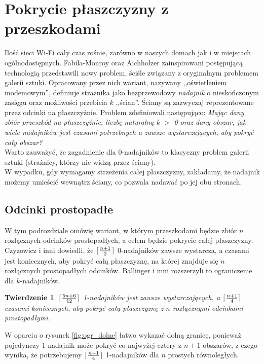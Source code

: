 \documentclass[brudnopis]{xmgr}
\DeclarePairedDelimiter\ceil{\lceil}{\rceil}
\newtheorem{Twierdzenie}{Twierdzenie}
\theoremstyle{definition}
\begin{document}
\section{Pokrycie płaszczyzny z przeszkodami}\label{sec:knadajniki}
	Ilość sieci Wi-Fi cały czas rośnie, zarówno w naszych domach jak i w miejscach ogólnodostępnych. Fabila-Monroy oraz Aichholzer \cite{fabilamonroy} zainspirowani postępującą technologią przedstawili nowy problem, ściśle związany z oryginalnym problemem galerii sztuki. Opracowany przez nich wariant, nazywany ,,oświetleniem modemowym'', definiuje strażnika jako bezprzewodowy \emph{nadajnik} o nieskończonym zasięgu oraz możliwości przebicia $k$ ,,ścian''. Ściany są zazwyczaj reprezentowane przez odcinki na płaszczyźnie. Problem zdefiniowali następująco: \emph{Mając dany zbiór przeszkód na płaszczyźnie, liczbę naturalną k $>$ 0 oraz dany obszar, jak wiele nadajników jest czasami potrzebnych a zawsze wystarczających, aby pokryć cały obszar?}  
\\\indent Warto zauważyć, że zagadnienie dla 0-nadajników to klasyczny problem galerii sztuki (strażnicy, którzy nie widzą przez ściany).
\\\indent W wypadku, gdy wymagamy strzeżenia całej płaszczyzny, zakładamy, że nadajnik możemy umieścić wewnątrz ściany, co pozwala nadawać po jej obu stronach.
\subsection{Odcinki prostopadłe}
W tym podrozdziale omówię wariant, w którym przeszkodami będzie zbiór $n$ rozłącznych odcinków prostopadłych, a celem będzie pokrycie całej płaszczyzny. Czyzowicz i inni \cite{czyzowicz} dowiedli, że $\ceil{\frac{n+1}{2}}$ 0-nadajników zawsze wystarcza, a czasami jest koniecznych, aby pokryć całą płaszczyznę, na której znajduje się $n$ rozłącznych prostopadłych odcinków. Ballinger i inni \cite{knadajniki} rozszerzyli to ograniczenie dla $k$-nadajników.

\begin{Twierdzenie} \label{ograniczenie zbiór odcinków prostopadłych} \cite{knadajniki}
  $\ceil{\frac{5n+6}{12}}$ 1-nadajników jest zawsze wystarczających, a $\ceil{\frac{n+1}{4}}$ czasami koniecznych, aby pokryć całą płaszczyznę z $n$ rozłącznymi odcinkami prostopadłymi.
\end{Twierdzenie}
\indent W oparciu o rysunek \ref{fig:ogr_dolne} łatwo wykazać dolną granicę, ponieważ pojedynczy 1-nadajnik może pokryć co najwyżej cztery z $n + 1$ obszarów, z czego wynika, że potrzebujemy $\ceil{\frac{n+1}{4}}$ 1-nadajników dla $n$ prostych równoległych.
\end{document}
